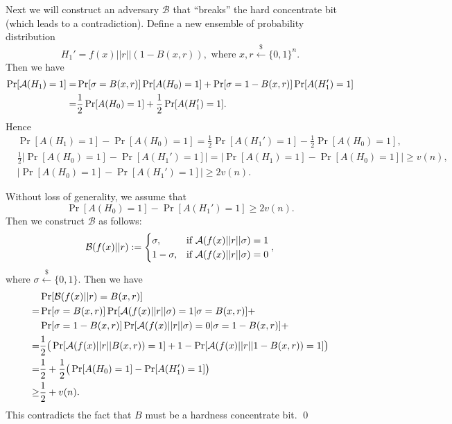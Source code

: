 Next we will construct an adversary $\mathcal{B}$ that ``breaks'' the hard concentrate bit (which leads to a contradiction).
Define a new ensemble of probability distribution
\[
H_1' = f(x) || r || (1-B(x, r)) , \text{ where } x, r \xleftarrow{\$} \{0, 1\}^n.
\]
Then we have
\begin{align*}
\Pr[\mathcal{A}(H_1) = 1]
=& \Pr[\sigma = B(x, r)] \Pr[A(H_0) = 1] + \Pr[\sigma = 1 - B(x, r)] \Pr[A(H_1') = 1]\\
=& \frac{1}{2} \Pr[A(H_0) = 1] + \frac{1}{2}\Pr[A(H_1') = 1].
\end{align*}
Hence
\begin{align*}
&\Pr[A(H_1) = 1] - \Pr[A(H_0) = 1]
=  \frac{1}{2}\Pr[A(H_1') = 1] - \frac{1}{2} \Pr[A(H_0) = 1],
\\
&\frac{1}{2} \left|\Pr[A(H_0) = 1] - \Pr[A(H_1') = 1] \right|
= \left| \Pr[A(H_1) = 1] - \Pr[A(H_0) = 1] \right|
\geq v(n),
\\
&\left|\Pr[A(H_0) = 1] - \Pr[A(H_1') = 1] \right|
\geq 2v(n).
\end{align*}

Without loss of generality, we assume that
\[
\Pr[A(H_0) = 1] - \Pr[A(H_1') = 1]
\geq 2v(n).
\]
Then we construct $\mathcal{B}$ as follows:
\[
\mathcal{B}(f(x)|| r) :=
\begin{cases}
\sigma, & \text{if } \mathcal{A}(f(x)|| r||\sigma) = 1\\
1 - \sigma, & \text{if } \mathcal{A}(f(x)||r|| \sigma) = 0
\end{cases},
\]
where $\sigma \xleftarrow{\$} \{0, 1\}$.
Then we have
\begin{align*}
& \Pr[\mathcal{B}(f(x)|| r) = B(x, r)]\\
=& \Pr[\sigma = B(x, r)] \Pr[ \mathcal{A}(f(x)|| r||\sigma)=1 | \sigma = B(x, r)] + \\
& \Pr[\sigma = 1 - B(x, r)] \Pr[ \mathcal{A}(f(x)|| r||\sigma) = 0 | \sigma = 1- B(x, r)] + \\
=& \frac{1}{2} \big( \Pr[\mathcal{A}(f(x)||r||B(x, r)) = 1] + 1 - \Pr[\mathcal{A}(f(x)|| r|| 1- B(x, r)) = 1] \big)\\
=& \frac{1}{2} + \frac{1}{2} \big( \Pr[A(H_0) = 1] - \Pr[A(H_1') = 1] \big)\\
\geq & \frac{1}{2} + v(n).
\end{align*}
This contradicts the fact that $B$ must be a hardness concentrate bit.
\qed


